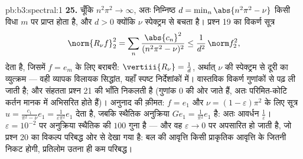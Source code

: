 \begin{solution}{pb:b3:spectral:1}
\textbf{25.} चूँकि $n^2\pi^2 \to \infty$, अतः निम्निष्ठ $d =
\min_n\abs{n^2\pi^2 - \nu}$ किसी विधा $m$ पर
प्राप्त होता है, और $d > 0$ क्योंकि $\nu$ स्पेक्ट्रम से बचता है। प्रश्न
19 का विकर्ण सूत्र
\[
\norm{R_\nu f}_2^2 =
\sum_n\frac{\abs{c_n}^2}{(n^2\pi^2 - \nu)^2}
\leq \frac1{d^2}\,\norm f_2^2,
\]
देता है, जिसमें $f = e_m$ के लिए बराबरी: $\vertiii{R_\nu} = \frac1d$, अर्थात् $\nu$ की स्पेक्ट्रम
से दूरी का व्युत्क्रम --- वही व्यापक विलायक सिद्धांत, यहाँ स्पष्ट
निर्देशांकों में।  वास्तविक विकर्ण गुणांकों से पढ़ ली जाती
है; और संहतता प्रश्न 21 की भाँति निकलती है (गुणांक $0$ की ओर जाते
हैं, अतः परिमित-कोटि कर्तन मानक में अभिसरित होते हैं)। अनुनाद की
क़ीमत: $f = e_1$ और $\nu =
(1-\varepsilon)\pi^2$ के लिए सूत्र $u =
\frac{c_1}{\pi^2 - \nu}e_1 = \frac1{\varepsilon\pi^2}e_1$ देता है, जबकि स्थैतिक अनुक्रिया
$Ge_1 = \frac1{\pi^2}e_1$ है: अतः आवर्धन $\frac1\varepsilon$। $\varepsilon =
10^{-2}$ पर अनुक्रिया स्थैतिक की $100$ गुना
है --- और वह $\varepsilon \to 0$ पर अपसारित हो जाती है, जो प्रश्न 20 का विकल्प
परिबद्ध ओर से देखा गया है: बल की आवृत्ति किसी प्राकृतिक आवृत्ति के
जितनी निकट होगी, प्रतिलोम उतना ही कम परिबद्ध।
\end{solution}
